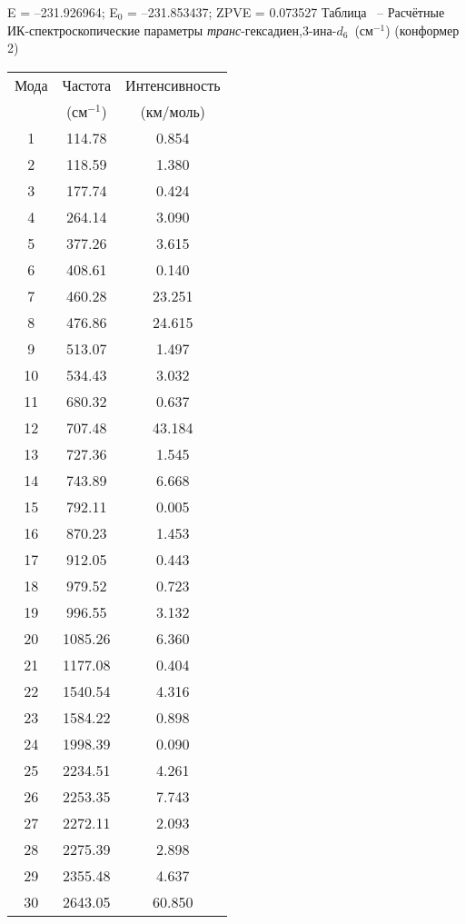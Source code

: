 {E =  --231.926964;    E$_0$ =  --231.853437; ZPVE = 0.073527
\newpage {}
Таблица \thet\, -- Расчётные ИК-спектроскопические параметры {\itshape транс}-гексадиен,3\nobreakdash-ина-$d_6$~(см$^{-1}$) (конформер 2)
 \begin{center}
\begin{tabular}{ccc}
Мода & Частота   & Интенсивность \\
&(см$^{-1}$)&(км/моль)\\
 \hline
    1 &  114.78 &    0.854 \\
    2 &  118.59 &    1.380 \\
    3 &  177.74 &     0.424 \\
    4 &  264.14 &    3.090 \\
    5 &  377.26 &    3.615 \\
    6 &  408.61 &     0.140 \\
    7 &  460.28 &    23.251 \\
    8 &  476.86 &   24.615 \\
    9 &  513.07 &     1.497 \\
   10 &  534.43 &     3.032 \\
   11 &  680.32 &    0.637 \\
   12 &  707.48 &    43.184 \\
   13 &  727.36 &     1.545 \\
   14 &  743.89 &     6.668 \\
   15 &  792.11 &     0.005 \\
   16 &  870.23 &     1.453 \\
   17 &  912.05 &    0.443 \\
   18 &  979.52 &     0.723 \\
   19 &  996.55 &     3.132 \\
   20 & 1085.26 &     6.360 \\
   21 & 1177.08 &     0.404 \\
   22 & 1540.54 &     4.316 \\
   23 & 1584.22 &    0.898 \\
   24 & 1998.39 &     0.090 \\
   25 & 2234.51 &    4.261 \\
   26 & 2253.35 &     7.743 \\
   27 & 2272.11 &     2.093 \\
   28 & 2275.39 &     2.898 \\
   29 & 2355.48 &     4.637 \\
   30 & 2643.05 &    60.850 \\
\end{tabular}
\end{center}

}